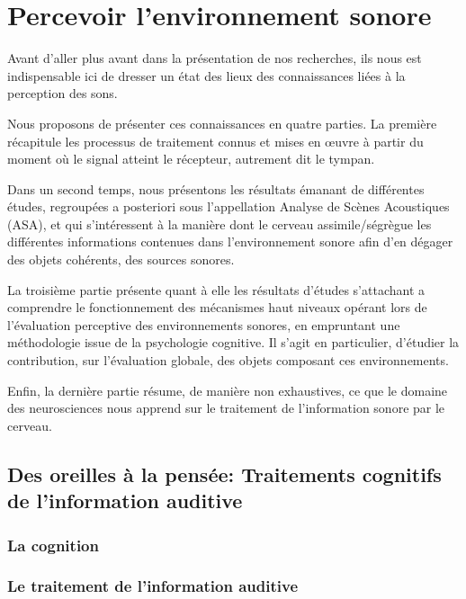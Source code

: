 \chapter{Percevoir l'environnement sonore}\label{ch:psycho_ea}

Avant d'aller plus avant dans la présentation de nos recherches, ils nous est indispensable ici de dresser un état des lieux des connaissances liées à la perception des sons.

Nous proposons de présenter ces connaissances en quatre parties. La première récapitule les processus de traitement connus et mises en œuvre à partir du moment où le signal atteint le récepteur, autrement dit le tympan. 

Dans un second temps, nous présentons les résultats émanant de différentes études, regroupées a posteriori sous l'appellation Analyse de Scènes Acoustiques (ASA), et qui s’intéressent à la manière dont le cerveau assimile/ségrègue  les différentes informations contenues dans l'environnement sonore afin d'en dégager des objets cohérents, \ie des sources sonores. 

La troisième partie présente quant à elle les résultats d'études s'attachant a comprendre le fonctionnement  des mécanismes haut niveaux opérant lors de l’évaluation perceptive des environnements sonores, en empruntant une méthodologie issue de la psychologie cognitive. Il s'agit en particulier, d'étudier la contribution, sur l'évaluation globale, des objets composant ces environnements.

Enfin, la dernière partie résume, de manière non exhaustives, ce que le domaine des neurosciences nous apprend sur le traitement de l'information sonore par le cerveau. 

\section{Des oreilles à la pensée: Traitements cognitifs de l'information auditive}

\subsection{La cognition}

\subsection{Le traitement de l'information auditive}

